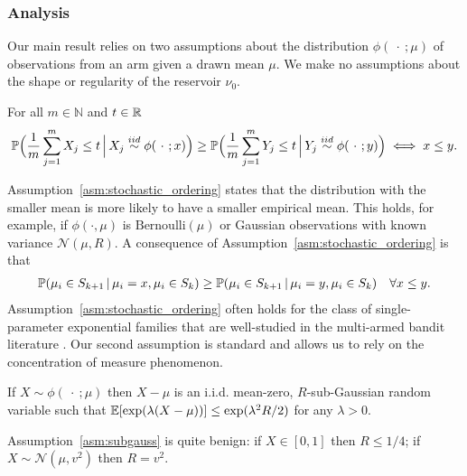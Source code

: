 \subsubsection{Analysis}
Our main result relies on two assumptions about the distribution $\phi(\ \cdot \ ; \mu)$ of observations from an arm given a drawn mean $\mu$.
We make no assumptions about the shape or regularity of the reservoir $\nu_0$.
\begin{assumption} \label{asm:stochastic_ordering}
For all $m \in \mathbb{N}$ and $t \in \R$
\begin{align*}
\P\Big(\frac{1}{m} \sum_{j=1}^m X_j \leq t \, \Big| \, X_j \overset{iid}{\sim} \phi( \ \cdot \ ; x) \Big) \geq \P\Big(\frac{1}{m} \sum_{j=1}^m Y_j \leq t \, \Big| \, Y_j \overset{iid}{\sim} \phi( \ \cdot \ ; y) \Big) \iff x \leq y.
\end{align*} 
\end{assumption}
Assumption~\ref{asm:stochastic_ordering} states that the distribution with the smaller mean is more likely to have a smaller empirical mean. 
This holds, for example, if $\phi(\cdot,\mu)$ is $\text{Bernoulli}(\mu)$ or Gaussian observations with known variance $\mathcal{N}(\mu,R)$.
A consequence of Assumption~\ref{asm:stochastic_ordering} is that
\begin{align*}
\P( \mu_i \in S_{k+1} \, | \, \mu_i = x, \mu_i \in S_{k} ) \geq \P( \mu_i \in S_{k+1} \, | \, \mu_i = y, \mu_i \in S_{k} ) \quad \forall x \leq y.
\end{align*} 
Assumption~\ref{asm:stochastic_ordering} often holds for the class of single-parameter exponential families that are well-studied in the multi-armed bandit literature \citep{audibert2010best}.
Our second assumption is standard and allows us to rely on the concentration of measure phenomenon.
\begin{assumption}\label{asm:subgauss}
If $X \sim \phi(\ \cdot \ ; \mu)$ then $X-\mu$ is an i.i.d. mean-zero, $R$-sub-Gaussian random variable such that $\E[\exp(\lambda (X-\mu))] \leq \exp(\lambda^2 R /2 )$ for any $\lambda >0$.
\end{assumption} 
Assumption~\ref{asm:subgauss} is quite benign: if $X \in [0,1]$ then $R \leq 1/4$; if $X \sim \mathcal{N}(\mu,v^2)$ then $R = v^2$.

